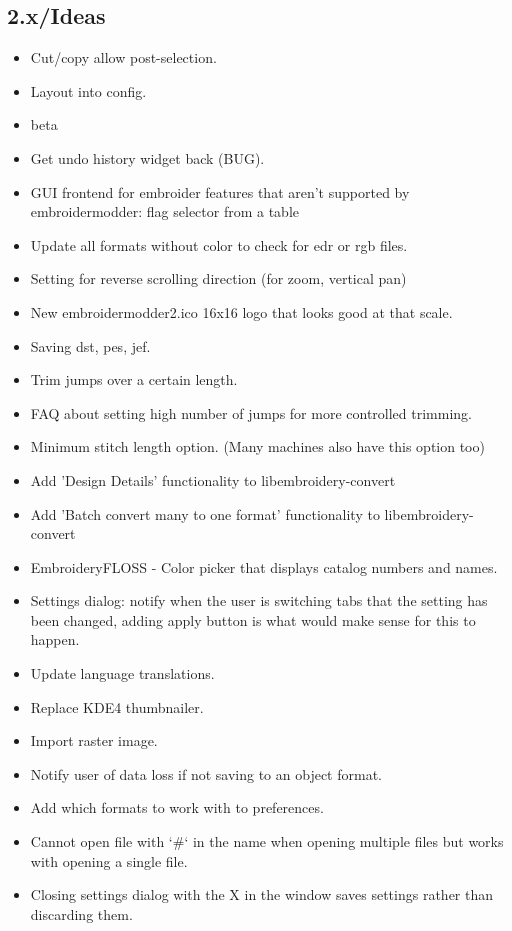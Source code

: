 \documentclass[10pt]{report}
\begin{document}
\subsection{2.x/Ideas}

\begin{itemize}
\item Cut/copy allow post-selection.
\item Layout into config.
\item beta
\item Get undo history widget back (BUG).
\item GUI frontend for embroider features that aren't supported by embroidermodder: flag selector from a table
\item Update all formats without color to check for edr or rgb files.
\item Setting for reverse scrolling direction (for zoom, vertical pan)
\item New embroidermodder2.ico 16x16 logo that looks good at that scale.
\item Saving dst, pes, jef.
\item Trim jumps over a certain length.
\item FAQ about setting high number of jumps for more controlled trimming.
\item Minimum stitch length option. (Many machines also have this option too)
\item Add 'Design Details' functionality to libembroidery-convert
\item Add 'Batch convert many to one format' functionality to libembroidery-convert
\item EmbroideryFLOSS - Color picker that displays catalog numbers and names.
\item Settings dialog: notify when the user is switching tabs that the setting has been changed, adding apply button is what would make sense for this to happen.
\item Update language translations.
\item Replace KDE4 thumbnailer.
\item Import raster image.
\item Notify user of data loss if not saving to an object format.
\item Add which formats to work with to preferences.
\item Cannot open file with `\#` in the name when opening multiple files but works with opening a single file.
\item Closing settings dialog with the X in the window saves settings rather than discarding them.

\end{itemize}
\end{document}
